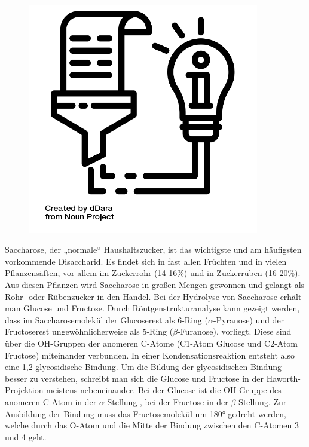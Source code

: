 \documentclass{scrartcl}  %
\begin{document}
\vspace{0.3cm}
			\begin{tcolorbox}[enhanced,
				colback=white,
				colframe=darkgray,
				fonttitle=\sffamily\bfseries\large, 
				title=Saccharose,  %
				attach boxed title to top left={xshift=3.2mm,yshift=-0.50mm},
				boxed title style={skin=enhancedfirst jigsaw,size=small,arc=1mm,bottom=-1mm,colframe=darkgray,height=0.75cm},
				colbacktitle=darkgray,
				drop lifted shadow]
				\begin{figure}  
					\centering
					\vspace{-14pt}  %
					\includegraphics[width=0.9\textwidth]{symbols/symbol_tex_content}
				\end{figure}
				
				Saccharose, der „normale“ Haushaltszucker, ist das wichtigste und am häufigsten vorkommende Disaccharid. Es findet sich in fast allen Früchten und in vielen Pflanzensäften, vor allem im Zuckerrohr (14-16\%) und in Zuckerrüben (16-20\%). Aus diesen Pflanzen wird Saccharose in großen Mengen gewonnen und gelangt als Rohr- oder Rübenzucker in den Handel. Bei der Hydrolyse von Saccharose erhält man Glucose und Fructose. Durch Röntgenstrukturanalyse kann gezeigt werden, dass im Saccharosemolekül der Glucoserest als 6-Ring ($\alpha$-Pyranose) und der Fructoserest ungewöhnlicherweise als 5-Ring ($\beta$-Furanose), vorliegt. Diese sind über die OH-Gruppen der anomeren C-Atome (C1-Atom Glucose und C2-Atom Fructose) miteinander verbunden. In einer Kondensationsreaktion entsteht also eine 1,2-glycosidische Bindung. 
				Um die Bildung der glycosidischen Bindung besser zu verstehen, schreibt man sich die Glucose und Fructose in der Haworth-Projektion meistens nebeneinander. Bei der Glucose ist die OH-Gruppe des anomeren C-Atom in der $\alpha$-Stellung , bei der Fructose in der $\beta$-Stellung. Zur Ausbildung der Bindung muss das Fructosemolekül um 180° gedreht werden, welche durch das O-Atom und die Mitte der Bindung zwischen den C-Atomen 3 und 4 geht.
				
			\end{tcolorbox}				
\end{document}

